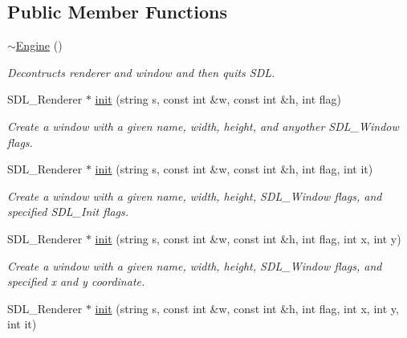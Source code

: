 \subsection*{Public Member Functions}
\begin{DoxyCompactItemize}
\item 
\hyperlink{classEngine_a8ef7030a089ecb30bbfcb9e43094717a}{$\sim$\+Engine} ()\hypertarget{classEngine_a8ef7030a089ecb30bbfcb9e43094717a}{}\label{classEngine_a8ef7030a089ecb30bbfcb9e43094717a}

\begin{DoxyCompactList}\small\item\em Decontructs renderer and window and then quits S\+DL. \end{DoxyCompactList}\item 
S\+D\+L\+\_\+\+Renderer $\ast$ \hyperlink{classEngine_af02c5fcfad817c5c8bc0a3cacfd9d4f8}{init} (string s, const int \&w, const int \&h, int flag)\hypertarget{classEngine_af02c5fcfad817c5c8bc0a3cacfd9d4f8}{}\label{classEngine_af02c5fcfad817c5c8bc0a3cacfd9d4f8}

\begin{DoxyCompactList}\small\item\em Create a window with a given name, width, height, and anyother S\+D\+L\+\_\+\+Window flags. \end{DoxyCompactList}\item 
S\+D\+L\+\_\+\+Renderer $\ast$ \hyperlink{classEngine_aca16d18226665d75acad41b48a8da989}{init} (string s, const int \&w, const int \&h, int flag, int it)\hypertarget{classEngine_aca16d18226665d75acad41b48a8da989}{}\label{classEngine_aca16d18226665d75acad41b48a8da989}

\begin{DoxyCompactList}\small\item\em Create a window with a given name, width, height, S\+D\+L\+\_\+\+Window flags, and specified S\+D\+L\+\_\+\+Init flags. \end{DoxyCompactList}\item 
S\+D\+L\+\_\+\+Renderer $\ast$ \hyperlink{classEngine_a4f80e210f2ae48208eed4ad17c309120}{init} (string s, const int \&w, const int \&h, int flag, int x, int y)\hypertarget{classEngine_a4f80e210f2ae48208eed4ad17c309120}{}\label{classEngine_a4f80e210f2ae48208eed4ad17c309120}

\begin{DoxyCompactList}\small\item\em Create a window with a given name, width, height, S\+D\+L\+\_\+\+Window flags, and specified x and y coordinate. \end{DoxyCompactList}\item 
S\+D\+L\+\_\+\+Renderer $\ast$ \hyperlink{classEngine_aa96fc831b44b6aae0f499360609c574d}{init} (string s, const int \&w, const int \&h, int flag, int x, int y, int it)\hypertarget{classEngine_aa96fc831b44b6aae0f499360609c574d}{}\label{classEngine_aa96fc831b44b6aae0f499360609c574d}


\end{DoxyCompactItemize}
